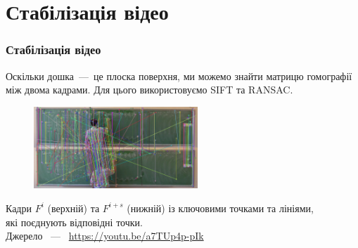 \section{Стабілізація відео}
\begin{frame}
  \frametitle{Стабілізація відео}

  Оскільки дошка~---~це плоска поверхня, ми можемо знайти матрицю гомографії між двома кадрами.
  Для цього використовуємо SIFT та RANSAC.
  \begin{figure}[H]
    \centering
    \includegraphics[width=0.55\textwidth]{images/matches_img}
  \end{figure}
  \begin{center}
    Кадри $F^i$ (верхній) та $F^{i+s}$ (нижній) із ключовими точками та лініями,\\
    які поєднують відповідні точки. \\
    Джерело ~---~ \url{https://youtu.be/a7TUp4p-pIk}
  \end{center}
\end{frame}
